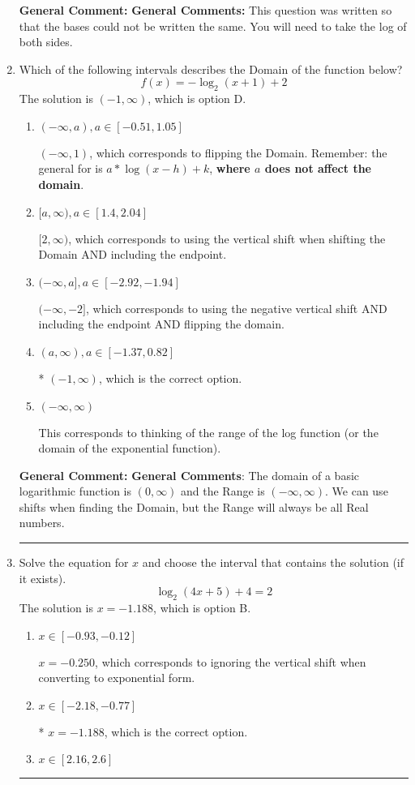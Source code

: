 \documentclass{extbook}[14pt]
\newcommand{\litem}[1]{\item #1

\rule{\textwidth}{0.4pt}}
\begin{document}
\begin{enumerate}
{\textbf{General Comment:} \textbf{General Comments:} This question was written so that the bases could not be written the same. You will need to take the log of both sides.
}
\litem{
Which of the following intervals describes the Domain of the function below?
\[ f(x) = -\log_2{(x+1)}+2 \]The solution is \( (-1, \infty) \), which is option D.\begin{enumerate}[label=\Alph*.]
\item \( (-\infty, a), a \in [-0.51, 1.05] \)

$(-\infty, 1)$, which corresponds to flipping the Domain. Remember: the general for is $a*\log(x-h)+k$, \textbf{where $a$ does not affect the domain}.
\item \( [a, \infty), a \in [1.4, 2.04] \)

$[2, \infty)$, which corresponds to using the vertical shift when shifting the Domain AND including the endpoint.
\item \( (-\infty, a], a \in [-2.92, -1.94] \)

$(-\infty, -2]$, which corresponds to using the negative vertical shift AND including the endpoint AND flipping the domain.
\item \( (a, \infty), a \in [-1.37, 0.82] \)

* $(-1, \infty)$, which is the correct option.
\item \( (-\infty, \infty) \)

This corresponds to thinking of the range of the log function (or the domain of the exponential function).
\end{enumerate}

\textbf{General Comment:} \textbf{General Comments}: The domain of a basic logarithmic function is $(0, \infty)$ and the Range is $(-\infty, \infty)$. We can use shifts when finding the Domain, but the Range will always be all Real numbers.
}
\litem{
Solve the equation for $x$ and choose the interval that contains the solution (if it exists).
\[ \log_{2}{(4x+5)}+4 = 2 \]The solution is \( x = -1.188 \), which is option B.\begin{enumerate}[label=\Alph*.]
\item \( x \in [-0.93, -0.12] \)

$x = -0.250$, which corresponds to ignoring the vertical shift when converting to exponential form.
\item \( x \in [-2.18, -0.77] \)

* $x = -1.188$, which is the correct option.
\item \( x \in [2.16, 2.6] \)


\end{enumerate}}
\end{enumerate}
\end{document}
